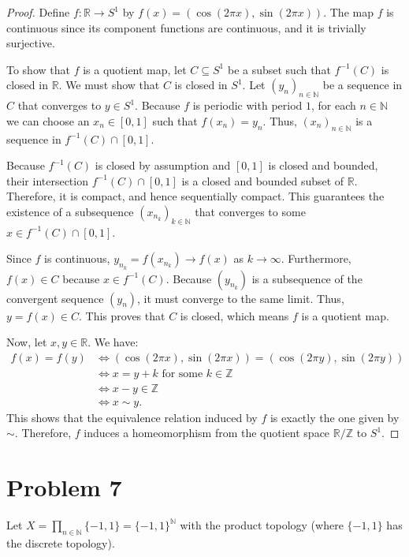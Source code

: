 \documentclass[a4paper,11pt]{article}
\newcommand{\N}{\mathbb{N}}
\newcommand{\Z}{\mathbb{Z}}
\newcommand{\R}{\mathbb{R}}
\begin{document}
\begin{proof}
    Define $f \colon \R \to S^1$ by $f(x) = (\cos(2\pi x), \sin(2\pi x))$. The map $f$ is continuous since its component functions are continuous, and it is trivially surjective.
    
    To show that $f$ is a quotient map, let $C \subseteq S^1$ be a subset such that $f^{-1}(C)$ is closed in $\R$. We must show that $C$ is closed in $S^1$. 
    Let $(y_n)_{n\in\N}$ be a sequence in $C$ that converges to $y\in S^1$. 
    Because $f$ is periodic with period $1$, for each $n \in \N$ we can choose an $x_n \in [0,1]$ such that $f(x_n) = y_n$. 
    Thus, $(x_n)_{n\in\N}$ is a sequence in $f^{-1}(C) \cap [0,1]$.
    
    Because $f^{-1}(C)$ is closed by assumption and $[0,1]$ is closed and bounded, their intersection $f^{-1}(C) \cap [0,1]$ is a closed and bounded subset of $\R$. Therefore, it is compact, and hence sequentially compact. 
    This guarantees the existence of a subsequence $(x_{n_k})_{k\in\N}$ that converges to some $x \in f^{-1}(C) \cap [0,1]$. 
    
    Since $f$ is continuous, $y_{n_k} = f(x_{n_k}) \to f(x)$ as $k \to \infty$. Furthermore, $f(x) \in C$ because $x \in f^{-1}(C)$. 
    Because $(y_{n_k})$ is a subsequence of the convergent sequence $(y_n)$, it must converge to the same limit. Thus, $y = f(x) \in C$. 
    This proves that $C$ is closed, which means $f$ is a quotient map.
    
    Now, let $x,y \in \R$. We have:
    \begin{align*}
        f(x) = f(y) 
        &\iff (\cos(2\pi x), \sin(2\pi x)) = (\cos(2\pi y), \sin(2\pi y)) \\
        &\iff x = y + k \text{ for some } k \in \Z \\
        &\iff x - y \in \Z \\
        &\iff x \sim y.
    \end{align*}
    This shows that the equivalence relation induced by $f$ is exactly the one given by $\sim$. Therefore, $f$ induces a homeomorphism from the quotient space $\R/\Z$ to $S^1$.
\end{proof}


\section*{Problem 7}
Let $X = \prod_{n\in\N}\{-1, 1\} = \{-1, 1\}^\N$ with the product topology (where $\{-1, 1\}$ has the discrete topology).
\end{document}
